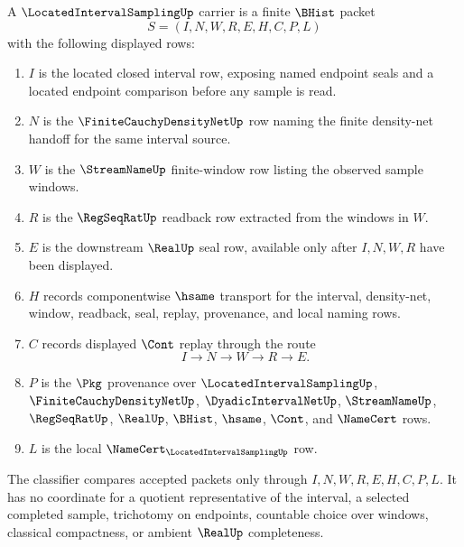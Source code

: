 \begin{definition}
\label{def:located-interval-sampling-carrier}
A $\LocatedIntervalSamplingUp$ carrier is a finite $\BHist$ packet
$$
S=(I,N,W,R,E,H,C,P,L)
$$
with the following displayed rows:
\begin{enumerate}
\item $I$ is the located closed interval row, exposing named endpoint seals and a located endpoint comparison before any sample is read.
\item $N$ is the $\FiniteCauchyDensityNetUp$ row naming the finite density-net handoff for the same interval source.
\item $W$ is the $\StreamNameUp$ finite-window row listing the observed sample windows.
\item $R$ is the $\RegSeqRatUp$ readback row extracted from the windows in $W$.
\item $E$ is the downstream $\RealUp$ seal row, available only after $I,N,W,R$ have been displayed.
\item $H$ records componentwise $\hsame$ transport for the interval, density-net, window, readback, seal, replay, provenance, and local naming rows.
\item $C$ records displayed $\Cont$ replay through the route
$$
I\longrightarrow N\longrightarrow W\longrightarrow R\longrightarrow E .
$$
\item $P$ is the $\Pkg$ provenance over $\LocatedIntervalSamplingUp$, $\FiniteCauchyDensityNetUp$, $\DyadicIntervalNetUp$, $\StreamNameUp$, $\RegSeqRatUp$, $\RealUp$, $\BHist$, $\hsame$, $\Cont$, and $\NameCert$ rows.
\item $L$ is the local $\NameCert_{\LocatedIntervalSamplingUp}$ row.
\end{enumerate}
The classifier compares accepted packets only through $I,N,W,R,E,H,C,P,L$. It has no coordinate for a quotient representative of the interval, a selected completed sample, trichotomy on endpoints, countable choice over windows, classical compactness, or ambient $\RealUp$ completeness.
\end{definition}

